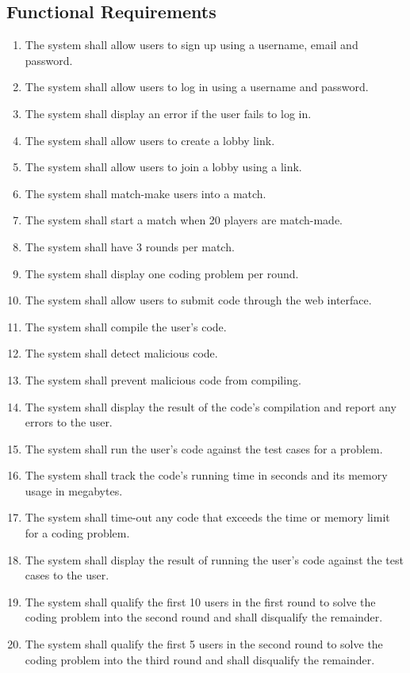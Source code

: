 \documentclass[12pt, titlepage]{article}
\begin{document}
\subsection{Functional Requirements}
\begin{enumerate}[label=FR.\arabic*]
    \item The system shall allow users to sign up using a username, email and password.
    \item The system shall allow users to log in using a username and password.
    \item The system shall display an error if the user fails to log in.
    \item The system shall allow users to create a lobby link.
    \item The system shall allow users to join a lobby using a link.
    \item The system shall match-make users into a match.
    \item The system shall start a match when 20 players are match-made.
    \item The system shall have 3 rounds per match.
    \item The system shall display one coding problem per round.
    \item The system shall allow users to submit code through the web interface.
    \item The system shall compile the user's code.
    \item The system shall detect malicious code.
    \item The system shall prevent malicious code from compiling.
    \item The system shall display the result of the code's compilation and report any errors to the user.
    \item The system shall run the user's code against the test cases for a problem.
    \item The system shall track the code's running time in seconds and its memory usage in megabytes.
    \item The system shall time-out any code that exceeds the time or memory limit for a coding problem.
    \item The system shall display the result of running the user's code against the test cases to the user.
    \item The system shall qualify the first 10 users in the first round to solve the coding problem into the second round and shall disqualify the remainder.
    \item The system shall qualify the first 5 users in the second round to solve the coding problem into the third round and shall disqualify the remainder.

\end{enumerate}
\end{document}
